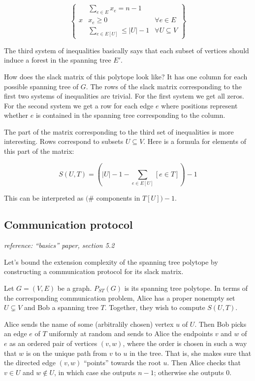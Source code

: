 \documentclass{article}
\begin{document}
$$
\left \{
\begin{array}{c|ccc}
	~ & \sum_{e \in E} x_e = n - 1   & ~ \\
	x & x_e \ge 0                     & \forall e \in E \\
	~ & \sum_{e \in E[U]} \le |U| - 1 & \forall U \subseteq V
\end{array}
\right \}
$$

The third system of inequalities basically says that each subset of vertices
should induce a forest in the spanning tree $E'$.

How does the slack matrix of this polytope look like? It has one column for
each possible spanning tree of $G$. The rows of the slack matrix corresponding
to the first two systems of inequalities are trivial. For the first system we
get all zeros. For the second system we get a row for each edge $e$ where
positions represent whether $e$ is contained in the spanning tree corresponding
to the column.

The part of the matrix corresponding to the third set of inequalities is more
interesting. Rows correspond to subsets $U \subseteq V$. Here is a formula for
elements of this part of the matrix:

$$
S(U, T) = \left ( |U| - 1 - \sum_{e \in E[U]} [e \in T] \right ) - 1
$$

This can be interpreted as $( \#$ components in $T[U]) - 1$.

\subsection{Communication protocol}

\emph{reference: \enquote{basics} paper, section 5.2}

\noindent
Let's bound the extension complexity of the spanning tree polytope by
constructing a communication protocol for its slack matrix.

Let $G = (V, E)$ be a graph. $P_{ST}(G)$ is its spanning tree polytope. In
terms of the corresponding communication problem, Alice has a proper nonempty
set $U \subsetneq V$ and Bob a spanning tree $T$. Together, they wish to
compute $S(U, T)$.

Alice sends the name of some (arbitralily chosen) vertex $u$ of $U$. Then Bob
picks an edge $e$ of $T$ uniformly at random and sends to Alice the endpoints
$v$ and $w$ of $e$ as an ordered pair of vertices $(v, w)$, where the order is
chosen in such a way that $w$ is on the unique path from $v$ to $u$ in the
tree. That is, she makes sure that the directed edge $(v, w)$ \enquote{points}
towards the root $u$. Then Alice checks that $v \in U$ and $w \notin U$, in
which case she outputs $n - 1$; otherwise she outputs $0$.
\end{document}
